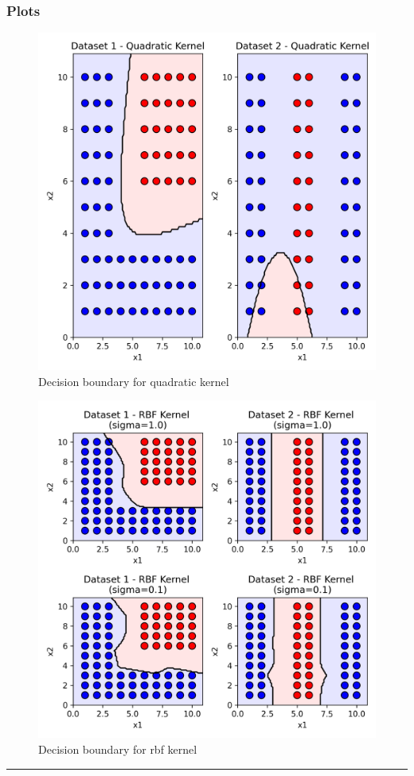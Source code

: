 \documentclass{article}
\begin{document}
\subsubsection*{Plots}
\begin{figure}
  \includegraphics{part_a_quadratic_kernel.png}
  \caption{Decision boundary for quadratic kernel}
\end{figure}

\begin{figure}
  \includegraphics{part_b_rbf_kernel.png}
  \caption{Decision boundary for rbf kernel}
\end{figure}
\noindent\rule{\textwidth}{0.4pt}\\
\end{document}

